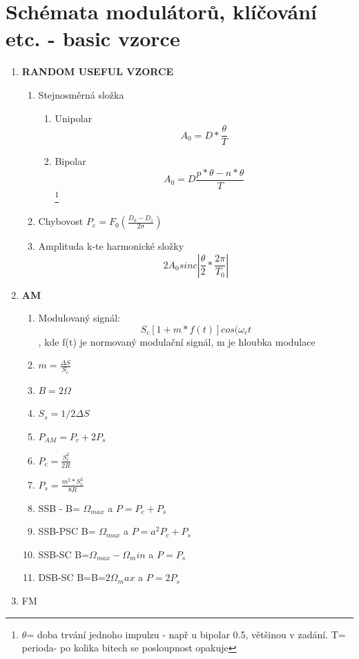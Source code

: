 \section{Schémata modulátorů, klíčování etc. - basic vzorce}
\begin{enumerate}
    \item \textbf{RANDOM USEFUL VZORCE}
    \begin{enumerate}
        \item Stejnosměrná složka
        \begin{enumerate}
            \item Unipolar$$A_0=D*\frac{\theta}{T}$$
            \item Bipolar$$A_0=D\frac{p*\theta-n*\theta}{T}$$\footnote{$\theta$= doba trvání jednoho impulzu - např u bipolar 0.5, většinou v zadání. T= perioda- po kolika bitech se posloupnost opakuje}
        \end{enumerate}
        \item Chybovost $P_e=F_0(\frac{D_0-D_1}{2\sigma})$
        \item Amplituda k-te harmonické složky$$2A_0sinc|\frac{\theta}{2}*\frac{2\pi}{T_0}|$$
    \end{enumerate}
    \item \textbf{AM }
        \begin{enumerate}
            \item Modulovaný signál:
            $$S_c[1+m*f(t)]cos(\omega_ct
            $$, kde f(t) je normovaný modulační signál, m je hloubka modulace
            \item $m=\frac{\Delta S}{S_c}$
            \item $B=2\Omega$
            \item $S_s=1/2\Delta S$
            \item $P_{AM}=P_c+2P_s$
            \item $P_c=\frac{S_c^2}{2R}$
            \item $P_s=\frac{m^2*S_c^2}{8R}$
            \item SSB - B= $\Omega_{max}$ a $P=P_c+P_s$
            \item SSB-PSC B= $\Omega_{max}$ a $P=a^2P_c+P_s$
            \item SSB-SC B=$\Omega_{max}-\Omega_min$ a $P=P_s$
            \item DSB-SC B=B=$2\Omega_max$ a $P=2P_s$
        \end{enumerate}
    \item FM
    \begin{enumerate}

\end{enumerate}
\end{enumerate}
